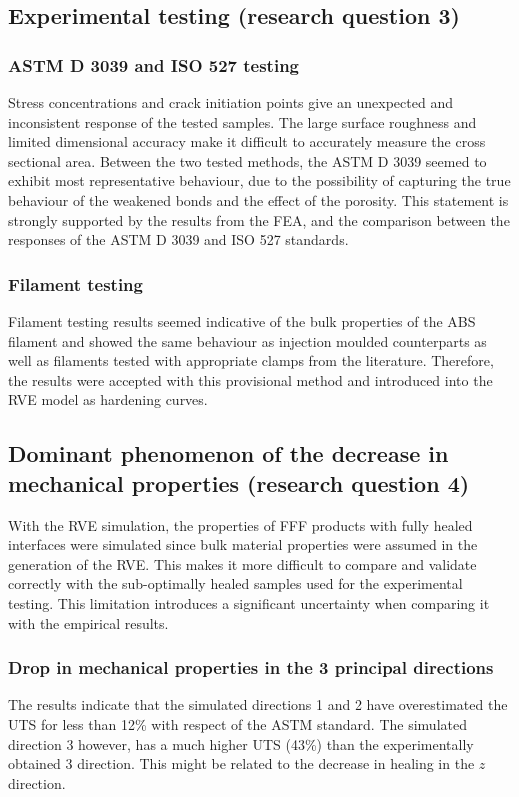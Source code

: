\subsection{Experimental testing (research question 3)}
\subsubsection{ASTM D 3039 and ISO 527 testing}
Stress concentrations and crack initiation points give an unexpected and inconsistent response of the tested samples. The large surface roughness and limited  dimensional accuracy make it difficult to accurately measure the cross sectional area. Between the two tested methods, the ASTM D 3039 seemed to exhibit most representative behaviour, due to the possibility of capturing the true behaviour of the weakened bonds and the effect of the porosity. This statement is strongly supported by the results from the FEA, and the comparison between the responses of the ASTM D 3039 and ISO 527 standards. 

\subsubsection{Filament testing}
Filament testing results seemed indicative of the bulk properties of the ABS filament and showed the same behaviour as injection moulded counterparts as well as filaments tested with appropriate clamps from the literature. Therefore, the results were accepted with this provisional method and introduced into the RVE model as hardening curves.

\subsection{Dominant phenomenon of the decrease in mechanical properties (research question 4)}
With the RVE simulation, the properties of FFF products with fully healed interfaces were simulated since bulk material properties were assumed in the generation of the RVE. This makes it more difficult to compare and validate correctly with the sub-optimally healed samples used for the experimental testing. This limitation introduces a significant uncertainty when comparing it with the empirical results. 
\subsubsection{Drop in mechanical properties in the 3 principal directions}
The results indicate that the simulated directions 1 and 2 have overestimated the UTS for less than 12\% with respect of the ASTM standard. The simulated direction 3 however, has a much higher UTS (43\%) than the experimentally obtained 3 direction. This might be related to the decrease in healing in the $z$ direction.

